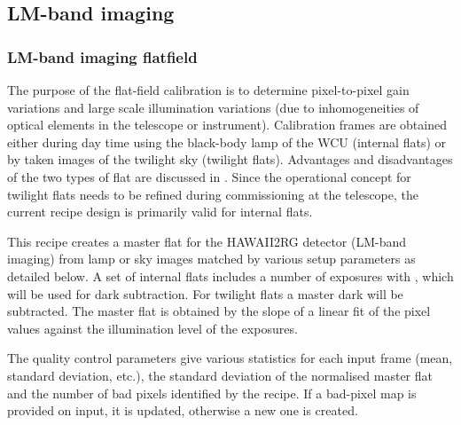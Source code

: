 
\subsection{LM-band imaging}
\label{ssec:recipes_img_lm}

\subsubsection{LM-band imaging flatfield}
\label{sssec:lm_img_flatfield}

The purpose of the flat-field calibration is to determine
pixel-to-pixel gain variations and large scale illumination variations
(due to inhomogeneities of optical elements in the telescope or
instrument). Calibration frames are obtained either during day time
using the black-body lamp of the \ac{WCU} (internal flats) or by taken
images of the twilight sky (twilight flats). Advantages and
disadvantages of the two types of flat are discussed in
\cite{METIS-calibration_plan}. Since the operational concept for
twilight flats needs to be refined during commissioning at the
telescope, the current recipe design is primarily valid for internal
flats.

This recipe creates a master flat for the HAWAII2RG detector (LM-band
imaging) from lamp or sky images matched by various setup parameters
as detailed below.  A set of internal flats includes a number of
exposures with , which will be used for dark
subtraction. For twilight flats a master dark will be subtracted. The
master flat is obtained by the slope of a linear fit of the pixel
values against the illumination level of the exposures.

The quality control parameters give various statistics for each input
frame (mean, standard deviation, etc.), the standard deviation of the
normalised master flat and the number of bad pixels identified by the
recipe. If a bad-pixel map is provided on input, it is updated,
otherwise a new one is created.

